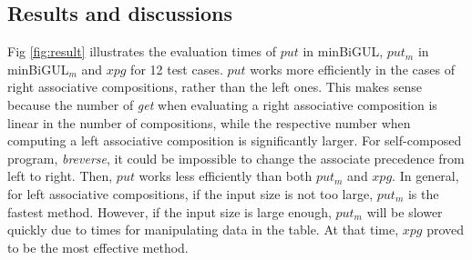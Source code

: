 \subsection{Results and discussions}



Fig \ref{fig:result} illustrates the evaluation times of $put$ in minBiGUL, $put_m$ in minBiGUL$_m$ and $xpg$ for 12 test cases. $put$ works more efficiently in the cases of right associative compositions, rather than the left ones. This makes sense because the number of \textit{get} when evaluating a right associative composition is linear in the number of compositions, while the respective number when computing a left associative composition is significantly larger. For self-composed program, \textit{breverse}, it could be impossible to change the associate precedence from left to right. Then, $put$ works less efficiently than both $put_m$ and $xpg$. In general, for left associative compositions, if the input size is not too large, $put_m$ is the fastest method. However, if the input size is large enough, $put_m$ will be slower quickly due to times for manipulating data in the table. At that time, $xpg$ proved to be the most effective method.
